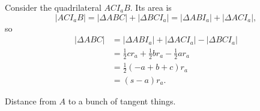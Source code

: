 \documentclass[twoside,10pt]{article}
\begin{document}
Consider the quadrilateral $ACI_{a}B$. Its area is
\[
|ACI_{a}B| = |\Delta ABC| + |\Delta BCI_{a}| = |\Delta ABI_{a}|+|\Delta ACI_{a}|,
\] so
\begin{align*}
	|\Delta ABC| &= |\Delta ABI_{a}| +|\Delta ACI_{a}| - |\Delta BCI_{a}| \\
		     &= \frac{1}{2} cr_{a} + \frac{1}{2} br_{a} - \frac{1}{2} ar_{a} \\
		     &= \frac{1}{2} (-a+b+c)r_{a} \\
		     &= (s-a)r_{a}.
\end{align*}

\newpage

\begin{exer}[1.81]
Distance from $A$ to a bunch of tangent things.
\end{exer}
\end{document}
